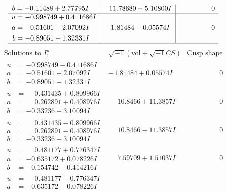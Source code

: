 \documentclass[1p]{elsarticle_modified}
\theoremstyle{definition}
\newcommand{\I}{\sqrt{-1}}
\begin{document}
$$\begin{array}{c|c|c}
\begin{aligned}
b &= -0.11488 + 2.77795 I\end{aligned}
 & \phantom{-}11.78680 - 5.10800 I & \phantom{-0.000000 } 0 \\ \hline\begin{aligned}
u &= -0.998749 + 0.411686 I \\
a &= -0.51601 - 2.07092 I \\
b &= -0.89051 - 1.32331 I\end{aligned}
 & -1.81484 - 0.05574 I & \phantom{-0.000000 } 0\\
 \hline 
 \end{array}$$\newpage$$\begin{array}{c|c|c}  
\text{Solutions to }I^u_{1}& \I (\text{vol} + \sqrt{-1}CS) & \text{Cusp shape}\\
 \hline 
\begin{aligned}
u &= -0.998749 - 0.411686 I \\
a &= -0.51601 + 2.07092 I \\
b &= -0.89051 + 1.32331 I\end{aligned}
 & -1.81484 + 0.05574 I & \phantom{-0.000000 } 0 \\ \hline\begin{aligned}
u &= \phantom{-}0.431435 + 0.809966 I \\
a &= \phantom{-}0.262891 + 0.408976 I \\
b &= -0.33236 + 3.10094 I\end{aligned}
 & \phantom{-}10.8466 + 11.3857 I & \phantom{-0.000000 } 0 \\ \hline\begin{aligned}
u &= \phantom{-}0.431435 - 0.809966 I \\
a &= \phantom{-}0.262891 - 0.408976 I \\
b &= -0.33236 - 3.10094 I\end{aligned}
 & \phantom{-}10.8466 - 11.3857 I & \phantom{-0.000000 } 0 \\ \hline\begin{aligned}
u &= \phantom{-}0.481177 + 0.776347 I \\
a &= -0.635172 + 0.078226 I \\
b &= -0.154742 - 0.414216 I\end{aligned}
 & \phantom{-}7.59709 + 1.51037 I & \phantom{-0.000000 } 0 \\ \hline\begin{aligned}
u &= \phantom{-}0.481177 - 0.776347 I \\
a &= -0.635172 - 0.078226 I \\

\end{aligned}
\end{array}$$
\end{document}
